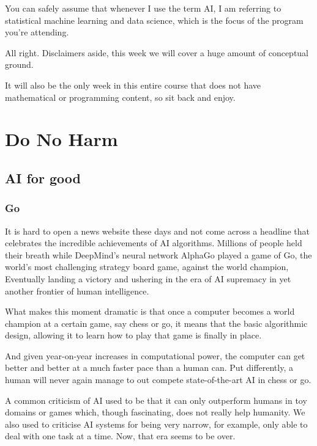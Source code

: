 \documentclass[
]{book}
\theoremstyle{definition}
\theoremstyle{definition}
\theoremstyle{definition}
\theoremstyle{definition}
\theoremstyle{remark}
\begin{document}
You can safely assume that whenever I use the term AI, I am referring to statistical machine learning and data science, which is the focus of the program you're attending.

All right. Disclaimers aside, this week we will cover a huge amount of conceptual ground.

It will also be the only week in this entire course that does not have mathematical or programming content, so sit back and enjoy.

\hypertarget{do-no-harm}{%
\section{Do No Harm}\label{do-no-harm}}

\hypertarget{ai-for-good}{%
\subsection{AI for good}\label{ai-for-good}}

\hypertarget{go}{%
\subsubsection{Go}\label{go}}

It is hard to open a news website these days and not come across a headline that celebrates the incredible achievements of AI algorithms. Millions of people held their breath while DeepMind's neural network AlphaGo played a game of Go, the world's most challenging strategy board game, against the world champion, Eventually landing a victory and ushering in the era of AI supremacy in yet another frontier of human intelligence.

What makes this moment dramatic is that once a computer becomes a world champion at a certain game, say chess or go, it means that the basic algorithmic design, allowing it to learn how to play that game is finally in place.

And given year-on-year increases in computational power, the computer can get better and better at a much faster pace than a human can. Put differently,
a human will never again manage to out compete state-of-the-art AI in chess or go.

A common criticism of AI used to be that it can only outperform humans in toy
domains or games which, though fascinating, does not really help humanity. We also used to criticise AI systems for being very narrow, for example, only able to deal with one task at a time. Now, that era seems to be over.
\end{document}
